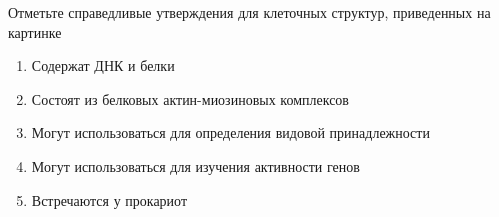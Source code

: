 
Отметьте справедливые утверждения для клеточных структур, приведенных на
картинке


\begin{enumerate}
    \item Содержат ДНК и белки
    \item Состоят из белковых актин-миозиновых комплексов 
    \item Могут использоваться для определения видовой принадлежности
    \item Могут использоваться для изучения активности генов
    \item Встречаются у прокариот
\end{enumerate}



